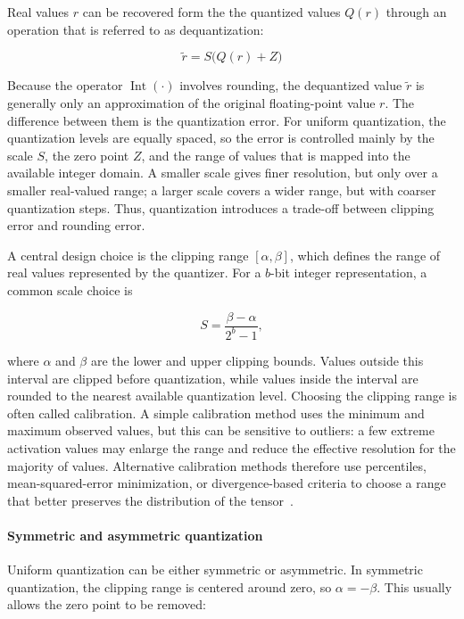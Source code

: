 \documentclass[12pt,a4paper]{report}
\begin{document}
Real values  $r$ can be recovered form the the quantized values $Q(r)$ through an operation that is referred to as
dequantization:

\begin{equation}
\tilde{r} = S \bigl(Q(r) + Z\bigr)
\end{equation}

Because the operator $\operatorname{Int}(\cdot)$ involves rounding, the dequantized value
$\tilde{r}$ is generally only an approximation of the original floating-point value $r$. The difference
between them is the quantization error. For uniform quantization, the quantization levels are
equally spaced, so the error is controlled mainly by the scale $S$, the zero point $Z$, and the
range of values that is mapped into the available integer domain. A smaller scale gives finer
resolution, but only over a smaller real-valued range; a larger scale covers a wider range, but
with coarser quantization steps. Thus, quantization introduces a trade-off between clipping error
and rounding error.

A central design choice is the clipping range $[\alpha, \beta]$, which defines the range of real
values represented by the quantizer. For a $b$-bit integer representation, a common scale choice is

\begin{equation}
S = \frac{\beta - \alpha}{2^b - 1},
\end{equation}

where $\alpha$ and $\beta$ are the lower and upper clipping bounds. Values outside this interval
are clipped before quantization, while values inside the interval are rounded to the nearest
available quantization level. Choosing the clipping range is often called calibration. A
simple calibration method uses the minimum and maximum observed values, but this can be
sensitive to outliers: a few extreme activation values may enlarge the range and reduce the
effective resolution for the majority of values. Alternative calibration methods therefore use
percentiles, mean-squared-error minimization, or divergence-based criteria to choose a range that
better preserves the distribution of the tensor~\cite{gholami2022survey}.

\paragraph{Symmetric and asymmetric quantization}
Uniform quantization can be either symmetric or asymmetric. In symmetric quantization, the
clipping range is centered around zero, so $\alpha = -\beta$. This usually allows the zero point to
be removed:
\end{document}
